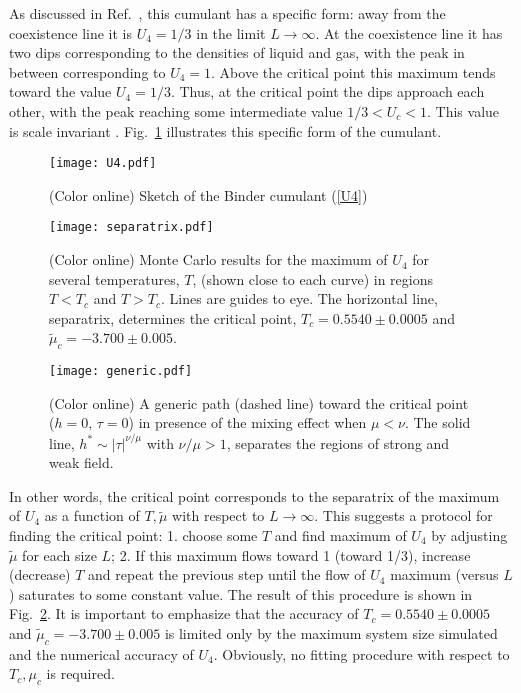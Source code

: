\documentclass[prb,aps,twocolumn,groupedaddress,floats,showpacs,final]{revtex4}
\begin{document}
As discussed in Ref.~\cite{Binder}, this  cumulant has a specific form: away from the coexistence line it is $U_4 =1/3$ in the limit $L\to \infty$. At the coexistence line it has two dips corresponding to the densities of liquid and gas, with the peak in between corresponding to $U_4=1$. Above the critical point this maximum tends toward the value $U_4=1/3$. Thus, at the critical point the dips approach each other, with the peak reaching some intermediate value $1/3 <U_c <1$. This value is scale invariant \cite{Fisher_2003_2}. Fig.~\ref{fig:U4} illustrates this specific form of the cumulant.
\begin{figure}
\vspace*{-0.5cm}
 \texttt{[image: U4.pdf]}
\vskip-8mm
\caption{(Color online) Sketch of the Binder cumulant (\ref{U4})}
\label{fig:U4}
\vskip-5mm
\end{figure}
\begin{figure}
\vspace*{-0.5cm}
 \texttt{[image: separatrix.pdf]}
\vskip-8mm
\caption{(Color online)
Monte Carlo results for the maximum of $U_4$ for several temperatures, $T$, (shown close to each curve) in regions $ T < T_c$ and $ T > T_c$. Lines are guides to eye.
The horizontal line, separatrix, determines the critical point, $T_c=0.5540 \pm 0.0005$
and $\tilde{\mu}_c=-3.700 \pm 0.005$.}
\label{fig:sep}
\end{figure}
\begin{figure}
\vspace*{-0.5cm}
 \texttt{[image: generic.pdf]}
\vskip-8mm
\caption{(Color online) A generic path (dashed line) toward the critical point ($h=0,\,\tau=0$) in presence of the mixing effect when $\mu <\nu$. The solid line, $h^* \sim |\tau|^{\nu/\mu}$  with  $\nu/\mu >1$, separates the regions of strong and weak field. }
\label{fig:generic}
\end{figure}
In other words, the critical point corresponds to the separatrix of the maximum of $U_4$ as a function of $T,\tilde{\mu}$ with respect  to $L \to \infty$. This suggests a protocol for finding the critical point: 1. choose some $T$ and find maximum of $U_4$ by adjusting $\tilde{\mu}$ for each size $ L$; 2. If this maximum flows toward 1 (toward 1/3), increase (decrease) $T$ and repeat the previous step  until the flow of $U_4$ maximum (versus $L$) saturates to some constant value. The result of this procedure is shown in Fig.~\ref{fig:sep}. It is important to emphasize that the accuracy of $T_c=0.5540\pm 0.0005$
and $\tilde{\mu}_c=-3.700 \pm 0.005$  is limited only by the maximum system size simulated and the numerical accuracy of $U_4$.
Obviously, no fitting procedure with respect to $T_c, \mu_c$ is required.
\end{document}
